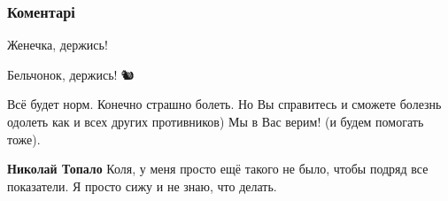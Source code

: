  
 
 
 
 
\subsubsection{Коментарі}
\label{sec:27_07_2021.fb.bilchenko_evgenia.5.bolezn.cmt}

\begin{itemize}
 
Женечка, держись!

 
Бельчонок, держись! 🐿️

 
Всё будет норм. Конечно страшно болеть. Но Вы справитесь и сможете болезнь
одолеть как и всех других противников) Мы в Вас верим! (и будем помогать тоже).

\begin{itemize}
 
\textbf{Николай Топало} Коля, у меня просто ещё такого не было, чтобы подряд все показатели. Я просто сижу и не знаю, что делать.

 


\end{itemize}
\end{itemize}
